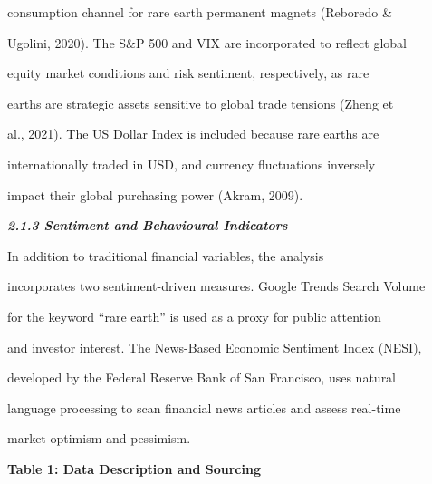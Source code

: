 consumption channel for rare earth permanent magnets (Reboredo \&

Ugolini, 2020). The S\&P 500 and VIX are incorporated to reflect global

equity market conditions and risk sentiment, respectively, as rare

earths are strategic assets sensitive to global trade tensions (Zheng et

al., 2021). The US Dollar Index is included because rare earths are

internationally traded in USD, and currency fluctuations inversely

impact their global purchasing power (Akram, 2009).



\emph{\textbf{2.1.3 Sentiment and Behavioural Indicators}}



In addition to traditional financial variables, the analysis

incorporates two sentiment-driven measures. Google Trends Search Volume

for the keyword ``rare earth'' is used as a proxy for public attention

and investor interest. The News-Based Economic Sentiment Index (NESI),

developed by the Federal Reserve Bank of San Francisco, uses natural

language processing to scan financial news articles and assess real-time

market optimism and pessimism.



\textbf{Table 1: Data Description and Sourcing}



